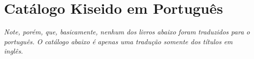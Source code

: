 \chapter{Catálogo Kiseido em Português}\label{ap:pt}

\emph{Note, porém, que, basicamente, nenhum dos livros abaixo foram traduzidos para o português. O catálogo abaixo é apenas uma tradução somente dos títulos em inglês.}

\bigskip